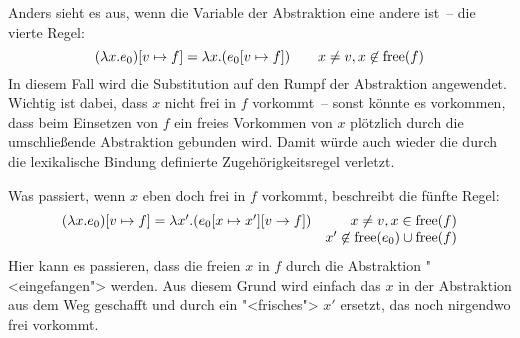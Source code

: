 Anders sieht es aus, wenn die Variable der Abstraktion eine andere
ist~-- die vierte Regel:
%
\begin{displaymath}
  (\lambda x.e_0)[v\mapsto f]  = \lambda x.(e_0[v\mapsto f])
  \qquad x\neq v, x\not\in\operatorname{free}(f)
\end{displaymath}
%
In diesem Fall wird die Substitution auf den Rumpf der Abstraktion
angewendet.  Wichtig ist dabei, dass $x$ nicht frei in $f$ vorkommt~-- sonst
könnte es vorkommen, dass beim Einsetzen von $f$ ein freies Vorkommen
von $x$ plötzlich durch die umschließende Abstraktion gebunden wird.
Damit würde auch wieder die durch die lexikalische Bindung definierte
Zugehörigkeitsregel verletzt.

Was passiert, wenn $x$ eben doch frei in $f$ vorkommt, beschreibt die
fünfte Regel:
%
\begin{displaymath}
  \begin{array}{lr}
      (\lambda x.e_0)[v\mapsto f] = \lambda x'.(e_0[x\mapsto x'][v\rightarrow f])
    & x\neq v, x\in\operatorname{free}(f)\\& x'\not\in\operatorname{free}(e_0)\cup\operatorname{free}(f)
  \end{array}
\end{displaymath}
%
Hier kann es passieren, dass die freien $x$ in $f$ durch die
Abstraktion "<eingefangen"> werden.  Aus diesem Grund wird einfach das
$x$ in der Abstraktion aus dem Weg geschafft und durch ein
"<frisches"> $x'$ ersetzt, das noch nirgendwo frei vorkommt.

